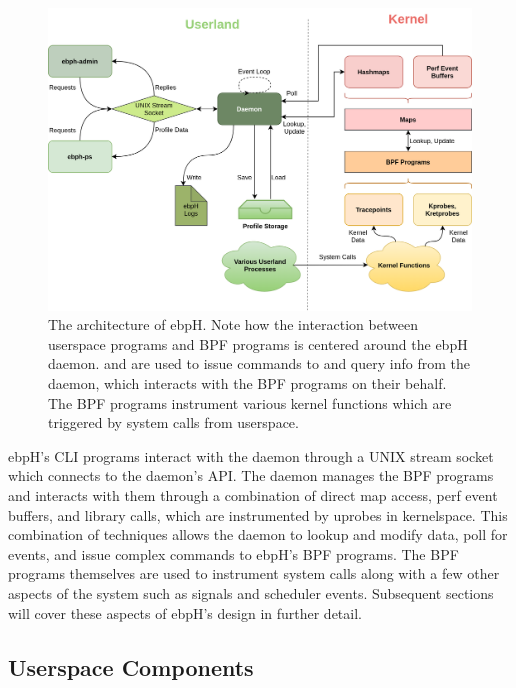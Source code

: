 \documentclass[
  12pt]{findlay}
\begin{document}
\begin{figure}
    \caption[The architecture of ebpH]{
        The architecture of ebpH. Note how the interaction between userspace programs
        and BPF programs is centered around the ebpH daemon.  and 
        are used to issue commands to and query info from the daemon, which interacts with the BPF
        programs on their behalf. The BPF programs instrument various kernel functions which are triggered
        by system calls from userspace.
    }
    \label{ebph-dataflow}
    \includegraphics[height=.4\textheight]{../figures/ebph-dataflow.png}
\end{figure}

ebpH's CLI programs interact with the daemon through a UNIX stream
socket which connects to the daemon's API. The daemon manages the BPF
programs and interacts with them through a combination of direct map
access, perf event buffers, and library calls, which are instrumented by
uprobes in kernelspace. This combination of techniques allows the daemon
to lookup and modify data, poll for events, and issue complex commands
to ebpH's BPF programs. The BPF programs themselves are used to
instrument system calls along with a few other aspects of the system
such as signals and scheduler events. Subsequent sections will cover
these aspects of ebpH's design in further detail.

\FloatBarrier

\hypertarget{userspace-components}{%
\subsection{Userspace Components}\label{userspace-components}}
\end{document}
